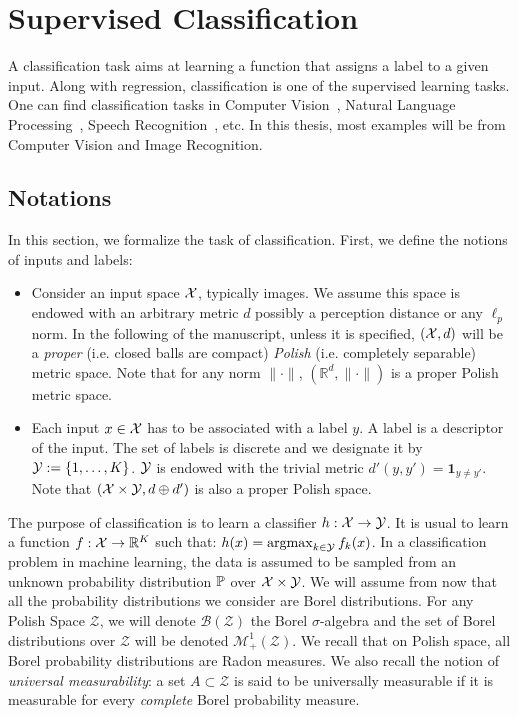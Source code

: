 \section{Supervised Classification}
A classification task aims at learning a function that assigns a label to a given input. Along with regression, classification is one of the  supervised learning tasks. One can find classification tasks in Computer Vision~\citep{lecun-mnisthandwrittendigit-2010,cifar-10,imagenet_cvpr09}, Natural Language Processing~\citep{xxx}, Speech Recognition~\citep{xxx}, etc. In this thesis, most examples will be from Computer Vision and Image Recognition. 
\subsection{Notations}
In this section, we formalize the task of classification. First, we define the notions of inputs and labels:
\begin{itemize}
    \item Consider an input space $\mathcal{X}$, typically images. We assume this space is endowed with an arbitrary metric $d$ possibly a perception distance or any $\ell_p$ norm. In the following of the manuscript, unless it is specified, $(\mathcal{X},d)$ will be a \textit{proper} (i.e. closed balls are compact) \textit{Polish} (i.e. completely separable) metric space. Note that for any norm $\lVert\cdot\rVert$,  $(\mathbb{R}^d,\lVert\cdot\rVert)$ is a proper Polish metric space.
    \item Each input $x\in \mathcal{X}$ has to be associated with a label $y$. A label is a descriptor of the input. The set of labels is discrete and we designate it by $\mathcal{Y}:=\{1,\dots,K\}$. $\mathcal{Y}$ is endowed with the trivial metric  $d'(y,y') = \mathbf{1}_{y\neq y'}$. Note that $(\mathcal{X}\times\mathcal{Y},d\oplus d')$ is also a proper Polish space.
\end{itemize}

The purpose of classification is to learn a classifier $h:\mathcal{X}\to\mathcal{Y}$. It is usual to learn a function $f:\mathcal{X}\to\mathbb{R}^K$ such that: $h(x) = \operatorname*{argmax}_{k\in\mathcal{Y}}f_k(x)$. In a classification problem in machine learning, the data is assumed to be sampled from an unknown probability distribution $\mathbb{P}$ over $\mathcal{X}\times\mathcal{Y}$. We will assume from now that all the probability distributions we consider are Borel distributions. For any Polish Space $\mathcal{Z}$, we will denote $\mathcal{B}(\mathcal{Z})$ the Borel $\sigma$-algebra and the set of Borel distributions over $\mathcal{Z}$  will be denoted $\mathcal{M}_+^1(\mathcal{Z})$. We recall that on Polish space, all Borel probability distributions are Radon measures. We also recall the notion of \textit{universal measurability}: a set $A\subset \mathcal{Z}$ is said to be universally measurable if it is measurable for every \textit{complete} Borel probability measure. 


